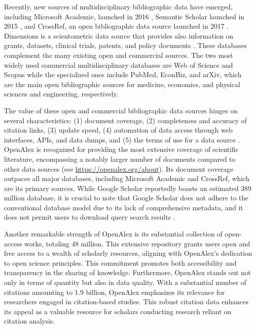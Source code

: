 Recently, new sources of multidisciplinary bibliographic data have emerged, including Microsoft Academic, launched in 2016 \citep{sinha2015overview, wang2019review, wang2020microsoft}, Semantic Scholar launched in 2015 \citep{ammar2018construction}, and CrossRef, an open bibliographic data source launched in 2017 \citep{hendricks2020crossref, van2018crossref}.  Dimensions is a scientometric data source that provides also information on grants, datasets, clinical trials, patents, and policy documents \citep{herzog2020dimensions, hook2018dimensions}. These databases complement the many existing open and commercial sources. The two most widely used commercial multidisciplinary databases are Web of Science and Scopus while the specialized ones include PubMed, EconBiz, and arXiv, which are the main open bibliographic sources for medicine, economics, and physical sciences and engineering, respectively.

The value of these open and commercial bibliographic data sources hinges on several characteristics: (1) document coverage, (2) completeness and accuracy of citation links, (3) update speed, (4) automation of data access through web interfaces, APIs, and data dumps, and (5) the terms of use for a data source \citep{wanyama2022you, kulkanjanapiban2022comparative, singh2021journal, martin2021google, visser2021large, waltman2020special, winter2017rentrez}. OpenAlex is recognized for providing the most extensive coverage of scientific literature, encompassing a notably larger number of documents compared to other data sources (see \href{https://openalex.org/about}{https://openalex.org/about}). Its document coverage outpaces all major databases, including Microsoft Academic \citep{visser2021large, wang2020microsoft} and CrossRef, which are its primary sources. While Google Scholar reportedly boasts an estimated 389 million database, it is crucial to note that Google Scholar does not adhere to the conventional database model due to its lack of comprehensive metadata, and it does not permit users to download query search results \citep{dallas2018variable}. 

Another remarkable strength of OpenAlex is its substantial collection of open-access works, totaling 48 million. This extensive repository grants users open and free access to a wealth of scholarly resources, aligning with OpenAlex's dedication to open science principles. This commitment promotes both accessibility and transparency in the sharing of knowledge. Furthermore, OpenAlex stands out not only in terms of quantity but also in data quality. With a substantial number of citations amounting to 1.9 billion, OpenAlex emphasizes its relevance for researchers engaged in citation-based studies. This robust citation data enhances its appeal as a valuable resource for scholars conducting research reliant on citation analysis.

